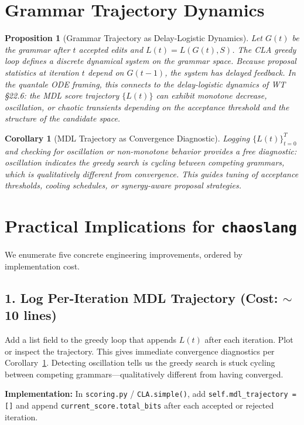 \documentclass[11pt]{article}
\newtheorem{proposition}{Proposition}
\newtheorem{corollary}{Corollary}
\begin{document}
\section{Grammar Trajectory Dynamics}

\begin{proposition}[Grammar Trajectory as Delay-Logistic Dynamics]
\label{prop:trajectory}
Let $G(t)$ be the grammar after $t$ accepted edits and $L(t) = L(G(t), S)$. The CLA greedy loop defines a discrete dynamical system on the grammar space. Because proposal statistics at iteration $t$ depend on $G(t-1)$, the system has delayed feedback. In the quantale ODE framing, this connects to the delay-logistic dynamics of WT \S22.6: the MDL score trajectory $\{L(t)\}$ can exhibit monotone decrease, oscillation, or chaotic transients depending on the acceptance threshold and the structure of the candidate space.
\end{proposition}

\begin{corollary}[MDL Trajectory as Convergence Diagnostic]
\label{cor:diagnostic}
Logging $\{L(t)\}_{t=0}^{T}$ and checking for oscillation or non-monotone behavior provides a free diagnostic: oscillation indicates the greedy search is cycling between competing grammars, which is qualitatively different from convergence. This guides tuning of acceptance thresholds, cooling schedules, or synergy-aware proposal strategies.
\end{corollary}

\section{Practical Implications for \texttt{chaoslang}}

We enumerate five concrete engineering improvements, ordered by implementation cost.

\subsection{1. Log Per-Iteration MDL Trajectory (Cost: $\sim$10 lines)}

Add a list field to the greedy loop that appends $L(t)$ after each iteration. Plot or inspect the trajectory. This gives immediate convergence diagnostics per Corollary~\ref{cor:diagnostic}. Detecting oscillation tells us the greedy search is stuck cycling between competing grammars---qualitatively different from having converged.

\textbf{Implementation:} In \texttt{scoring.py} / \texttt{CLA.simple()}, add \texttt{self.mdl\_trajectory = []} and append \texttt{current\_score.total\_bits} after each accepted or rejected iteration.
\end{document}
